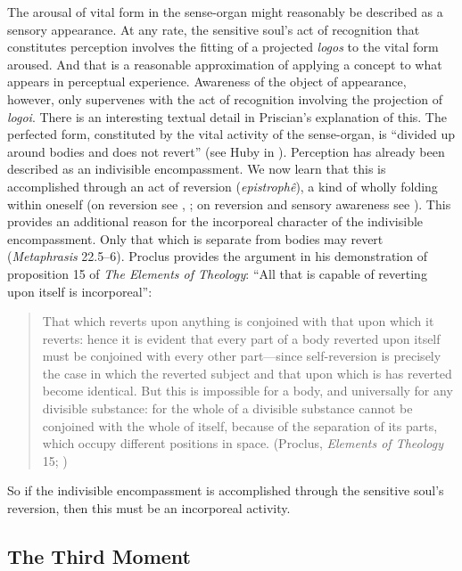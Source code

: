 \documentclass[12pt]{article}
\begin{document}
The arousal of vital form in the sense-organ might reasonably be described as a sensory appearance. At any rate, the sensitive soul's act of recognition that constitutes perception involves the fitting of a projected \emph{logos} to the vital form aroused. And that is a reasonable approximation of applying a concept to what appears in perceptual experience. Awareness of the object of appearance, however, only supervenes with the act of recognition involving the projection of \emph{logoi}. There is an interesting textual detail in Priscian's explanation of this. The perfected form, constituted by the vital activity of the sense-organ, is ``divided up around bodies and does not revert'' (see Huby in \citealt[51 n.31]{Sorabji:1997ly}). Perception has already been described as an indivisible encompassment. We now learn that this is accomplished through an act of reversion (\emph{epistrophê}), a kind of wholly folding within oneself (on reversion see \citealt[212--223]{Dodds:1963ul}, \citealt[126-30]{Lloyd:1990dp}; on reversion and sensory awareness see \citealt{Lautner:1994cs}). This provides an additional reason for the incorporeal character of the indivisible encompassment. Only that which is separate from bodies may revert (\emph{Metaphrasis} 22.5--6). Proclus provides the argument in his demonstration of proposition 15 of \emph{The Elements of Theology}: ``All that is capable of reverting upon itself is incorporeal'':
\begin{quote}
	That which reverts upon anything is conjoined with that upon which it reverts: hence it is evident that every part of a body reverted upon itself must be conjoined with every other part---since self-reversion is precisely the case in which the reverted subject and that upon which is has reverted become identical. But this is impossible for a body, and universally for any divisible substance: for the whole of a divisible substance cannot be conjoined with the whole of itself, because of the separation of its parts, which occupy different positions in space. (Proclus, \emph{Elements of Theology} 15; \citealt[18--19]{Dodds:1963ul})
\end{quote}
So if the indivisible encompassment is accomplished through the sensitive soul's reversion, then this must be an incorporeal activity. 


\subsection{The Third Moment} %
\label{sub:the_third_moment}
\end{document}
